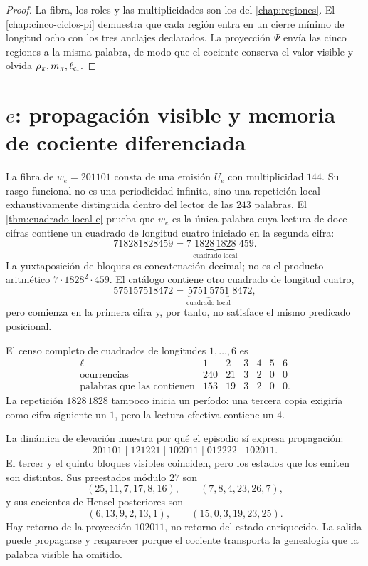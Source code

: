 \begin{proof}
La fibra, los roles y las multiplicidades son los del
\cref{chap:regiones}. El \cref{chap:cinco-ciclos-pi} demuestra que cada
región entra en un cierre mínimo de longitud ocho con los tres anclajes
declarados. La proyección \(\Psi\) envía las cinco regiones a la misma
palabra, de modo que el cociente conserva el valor visible y olvida
\(\rho_\pi,m_\pi,\ell_{\rm cl}\).
\end{proof}

\section{\texorpdfstring{\(e\)}{e}: propagación visible y memoria de cociente diferenciada}

La fibra de \(w_e=201101\) consta de una emisión \(U_e\) con multiplicidad
\(144\). Su rasgo funcional no es una periodicidad infinita, sino una
repetición local exhaustivamente distinguida dentro del lector de las
\(243\) palabras. El \cref{thm:cuadrado-local-e} prueba que \(w_e\) es la
única palabra cuya lectura de doce cifras contiene un cuadrado de longitud
cuatro iniciado en la segunda cifra:
\[
718281828459
=7\,\underbrace{1828\,1828}_{\text{cuadrado local}}\,459.
\]
La yuxtaposición de bloques es concatenación decimal; no es el producto
aritmético \(7\cdot1828^2\cdot459\). El catálogo contiene otro cuadrado de
longitud cuatro,
\[
575157518472
=\underbrace{5751\,5751}_{\text{cuadrado local}}\,8472,
\]
pero comienza en la primera cifra y, por tanto, no satisface el mismo
predicado posicional.

El censo completo de cuadrados de longitudes \(1,\ldots,6\) es
\[
\begin{array}{crrrrrr}
\ell&1&2&3&4&5&6\\
\text{ocurrencias}&240&21&3&2&0&0\\
\text{palabras que las contienen}&153&19&3&2&0&0.
\end{array}
\]
La repetición \(1828\,1828\) tampoco inicia un período: una tercera copia
exigiría como cifra siguiente un \(1\), pero la lectura efectiva contiene
un \(4\).

La dinámica de elevación muestra por qué el episodio sí expresa
propagación:
\[
201101\mid121221\mid102011\mid012222\mid102011.
\]
El tercer y el quinto bloques visibles coinciden, pero los estados que los
emiten son distintos. Sus preestados módulo \(27\) son
\[
(25,11,7,17,8,16),
\qquad
(7,8,4,23,26,7),
\]
y sus cocientes de Hensel posteriores son
\[
(6,13,9,2,13,1),
\qquad
(15,0,3,19,23,25).
\]
Hay retorno de la proyección \(102011\), no retorno del estado enriquecido.
La salida puede propagarse y reaparecer porque el cociente transporta la
genealogía que la palabra visible ha omitido.

